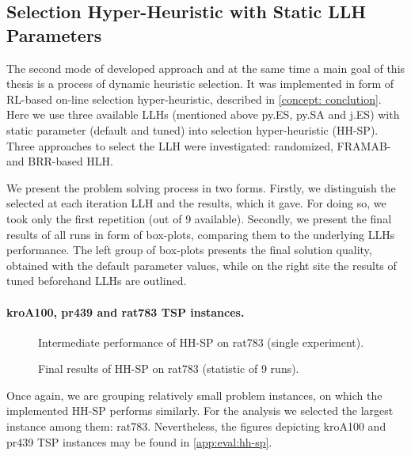 \subsection{Selection Hyper-Heuristic with Static LLH Parameters}\label{eval:1:hh-sp}
The second mode of developed approach and at the same time a main goal of this thesis is a process of dynamic heuristic selection. It was implemented in form of RL-based on-line selection hyper-heuristic, described in \cref{concept: conclution}. Here we use three available LLHs (mentioned above py.ES, py.SA and j.ES) with static parameter (default and tuned) into selection hyper-heuristic (HH-SP). Three approaches to select the LLH were investigated: randomized, FRAMAB- and BRR-based HLH.

We present the problem solving process in two forms. Firstly, we distinguish the selected at each iteration LLH and the results, which it gave. For doing so, we took only the first repetition (out of 9 available). Secondly, we present the final results of all runs in form of box-plots, comparing them to the underlying LLHs performance. The left group of box-plots presents the final solution quality, obtained with the default parameter values, while on the right site the results of tuned beforehand LLHs are outlined.

\paragraph{kroA100, pr439 and rat783 TSP instances.}
\begin{figure}[t]
	\centering
	\vspace{-20pt}
	
	\caption{Intermediate performance of HH-SP on rat783 (single experiment).}
	\vspace{-5pt}
	\label{eval:pict:hh-sp:rat783 intermediate}
\end{figure}
\begin{figure}[b]
	\centering
	\vspace{-20pt}
	
	\caption{Final results of HH-SP on rat783 (statistic of 9 runs).}
	\vspace{-5pt}
	\label{eval:pict:hh-sp:rat783 final}
\end{figure}
Once again, we are grouping relatively small problem instances, on which the implemented HH-SP performs similarly. For the analysis we selected the largest instance among them: rat783. Nevertheless, the figures depicting kroA100 and pr439 TSP instances may be found in \cref{app:eval:hh-sp}.

